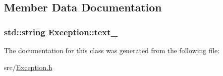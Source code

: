 \subsection{Member Data Documentation}
\hypertarget{classException_a404e79b557f64d95acfb5dccbb864860}{
\subsubsection[{text\-\_\-}]{\setlength{\rightskip}{0pt plus 5cm}std\-::string Exception\-::text\-\_\-\hspace{0.3cm}{\ttfamily [private]}}}\label{classException_a404e79b557f64d95acfb5dccbb864860}


The documentation for this class was generated from the following file\-:\begin{DoxyCompactItemize}
\item 
src/\hyperlink{Exception_8h}{Exception.\-h}\end{DoxyCompactItemize}
